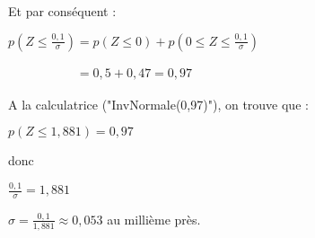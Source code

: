 \begin{corrige}
\begin{enumerate}
\begin{enumerate}
\begin{center}
\end{center}
               Et par conséquent :
               \par
               $p\left(Z \leqslant \frac{0,1}{\sigma}\right) =p\left(Z \leqslant 0 \right) +p\left(0 \leqslant Z \leqslant \frac{0,1}{\sigma}\right)  $
               \par
               $\phantom{p\left(Z \leqslant \frac{0,1}{\sigma}\right)} =0,5 + 0,47=0,97 $
\begin{center}
\end{center}
               A la calculatrice ("InvNormale(0,97)"), on trouve que :
               \par
               $p\left(Z \leqslant 1,881\right)=0,97 $

\begin{center}
\end{center}
               donc
               \par
               $\frac{0,1}{\sigma}=1,881$
               \par
               $\sigma=\frac{0,1}{1,881} \approx 0,053$ au millième près.
          \end{enumerate}
     \end{enumerate}
\end{corrige}

